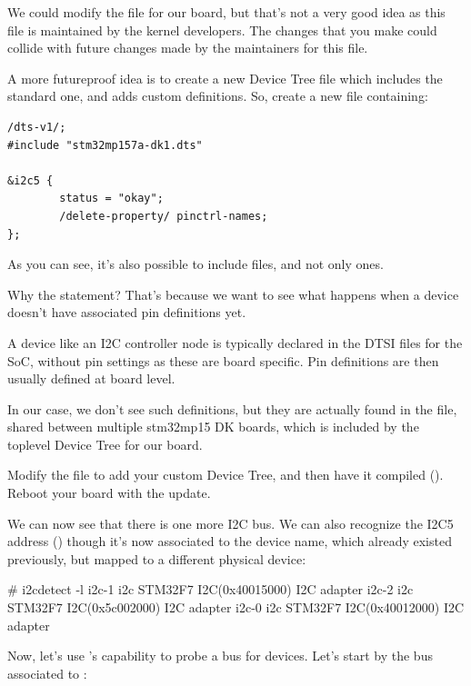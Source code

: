 We could modify the  file
for our board, but that's not a very good idea as this file is
maintained by the kernel developers. The changes that you make could
collide with future changes made by the maintainers for this file.

A more futureproof idea is to create a new Device Tree file which
includes the standard one, and adds custom definitions. So, create a
new  file containing:

\begin{verbatim}
/dts-v1/;
#include "stm32mp157a-dk1.dts"

&i2c5 {
        status = "okay";
        /delete-property/ pinctrl-names;
};
\end{verbatim}

As you can see, it's also possible to include  files, and not
only  ones.

Why the  statement? That's because we want
to see what happens when a device doesn't have associated pin
definitions yet.

A device like an I2C controller node is typically declared in the DTSI
files for the SoC, without pin settings as these are board
specific. Pin definitions are then usually defined at board level.

In our case, we don't see such definitions, but they are actually
found in the 
file, shared between multiple stm32mp15 DK boards, which is included
by the toplevel Device Tree for our board.

Modify the  file to add your custom
Device Tree, and then have it compiled (). Reboot
your board with the update.

We can now see that there is one more I2C bus. We can also recognize the
I2C5 address () though it's now associated to
the  device name, which already existed previously, but
mapped to a different physical device:

\begin{bashinput}
# i2cdetect -l
i2c-1	i2c             STM32F7 I2C(0x40015000)                 I2C adapter
i2c-2	i2c             STM32F7 I2C(0x5c002000)                 I2C adapter
i2c-0	i2c             STM32F7 I2C(0x40012000)                 I2C adapter
\end{bashinput}

Now, let's use 's capability to probe a bus for devices.
Let's start by the bus associated to :

